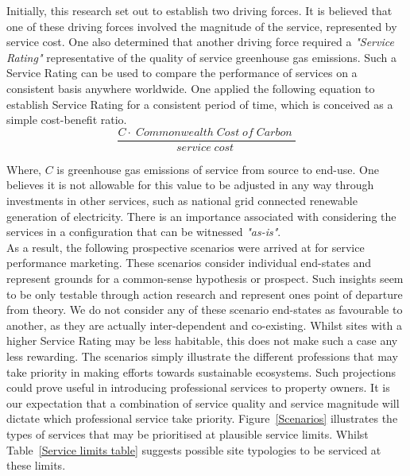 \documentclass[11pt, oneside]{article}   	%
\begin{document}
Initially, this research set out to establish two driving forces.
It is believed that one of these driving forces involved the magnitude of the service, represented by service cost.
One also determined that another driving force required a \emph{"Service Rating"} representative of the quality of service greenhouse gas emissions.
Such a Service Rating can be used to compare the performance of services on a consistent basis anywhere worldwide.
One applied the following equation to establish Service Rating for a consistent period of time, which is conceived as a simple cost-benefit ratio.\\

\begin{equation}
	\frac{C  \cdot \;Commonwealth\; Cost\; of\; Carbon\;}{service\; cost\;}
\end{equation}

Where, $C$ is greenhouse gas emissions of service from source to end-use.
One believes it is not allowable for this value to be adjusted in any way through investments in other services, such as national grid connected renewable generation of electricity.
There is an importance associated with considering the services in a configuration that can be witnessed \emph{"as-is"}.\\

As a result, the following prospective scenarios were arrived at for service performance marketing.
These scenarios consider individual end-states and represent grounds for a common-sense hypothesis or prospect.
Such insights seem to be only testable through action research and represent ones point of departure from theory.
We do not consider any of these scenario end-states as favourable to another, as they are actually inter-dependent and co-existing.
Whilst sites with a higher Service Rating may be less habitable, this does not make such a case any less rewarding.
The scenarios simply illustrate the different professions that may take priority in making efforts towards sustainable ecosystems.
Such projections could prove useful in introducing professional services to property owners.
It is our expectation that a combination of service quality and service magnitude will dictate which professional service take priority.
Figure~\ref{Scenarios} illustrates the types of services that may be prioritised at plausible service limits.
Whilst Table~\ref{Service limits table} suggests possible site typologies to be serviced at these limits.\\
\end{document}
